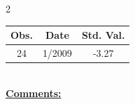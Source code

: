 
\bigskip 
\begin{multicols}{2}{ 
\begin{tabular}{ccc}
\hline  Obs.  &  Date &  Std. Val. \\ 
\hline 
                       24 &        1/2009 &         -3.27 \vspace{-.12in} \\  
 \end{tabular} 
\\ 
 \columnbreak 
 \singlespacing 
 \underline{\textbf{Comments:}} \\ 
 \bigskip       

 } 
\end{multicols} 
